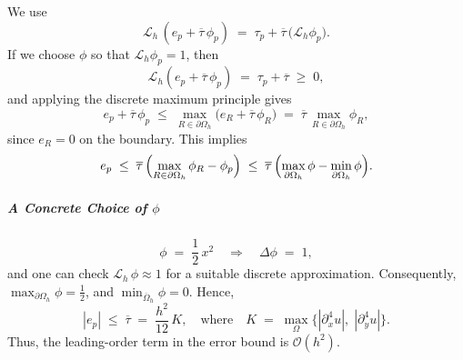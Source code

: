 We use
\[
  \mathcal{L}_h\,(e_p + \overline{\tau}\,\phi_p)
  \;=\;
  \tau_p + \overline{\tau}\,\bigl(\mathcal{L}_h \phi_p\bigr).
\]
If we choose \(\phi\) so that \(\mathcal{L}_h \phi_p = 1\), then
\[
  \mathcal{L}_h (e_p + \overline{\tau}\,\phi_p) \;=\; \tau_p + \overline{\tau} \;\ge\; 0,
\]
and applying the discrete maximum principle gives
\[
  e_p + \overline{\tau}\,\phi_p
  \;\le\;
  \max_{R \in \partial\Omega_h} \bigl(e_R + \overline{\tau}\,\phi_R\bigr)
  \;=\;
  \overline{\tau} \,\max_{R \in \partial\Omega_h}\phi_R,
\]
since \(e_R = 0\) on the boundary. This implies
\[
  e_p
  \;\le\;
  \overline{\tau}\,
  \Bigl(\max_{R \in \partial\Omega_h}\phi_R - \phi_p\Bigr)
  \;\le\;
  \overline{\tau}\,
  \Bigl(\max_{\partial\Omega_h}\phi - \min_{\partial\Omega_h}\phi\Bigr).
\]

\subparagraph{A Concrete Choice of \(\phi\)}
\[
  \phi \;=\; \frac12\,x^2
  \quad\Longrightarrow\quad
  \Delta \phi \;=\; 1,
\]
and one can check
\(\mathcal{L}_h\,\phi \approx 1\) for a suitable discrete approximation. Consequently, \(\max_{\partial\Omega_h} \phi = \tfrac{1}{2}\), and \(\min_{\overline{\Omega}_h}\phi = 0\). Hence,
\[
  |e_p|
  \;\le\;
  \overline{\tau}
  \;=\;
  \frac{h^2}{12}\,K,
  \quad
  \text{where}
  \quad
  K \;=\;
  \max_{\Omega}\bigl\{|\partial_x^4 u|,\;|\partial_y^4 u|\bigr\}.
\]
Thus, the leading-order term in the error bound is \(\mathcal{O}(h^2)\).
